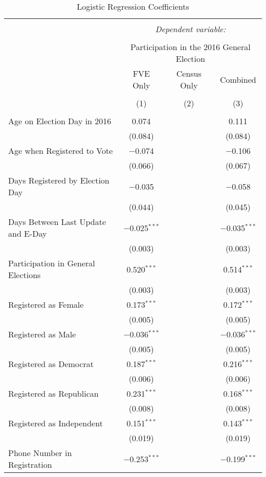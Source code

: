 
\begingroup 
\small 
\centering
\begin{longtable}{@{\extracolsep{5pt}}lccc}
  \caption{Logistic Regression Coefficients} \label{logistic} 
\\ \hline 
\hline \\[-1.8ex] 
 & \multicolumn{3}{c}{\textit{Dependent variable:}} \\ 
\cline{2-4} 
\\[-1.8ex] & \multicolumn{3}{c}{Participation in the 2016 General Election} \\ 
 & FVE Only & Census Only & Combined \\ 
\\[-1.8ex] & (1) & (2) & (3)\\ 
\hline \\[-1.8ex] 
 Age on Election Day in 2016 & 0.074 &  & 0.111 \\ 
  & (0.084) &  & (0.084) \\ 
  Age when Registered to Vote & $-$0.074 &  & $-$0.106 \\ 
  & (0.066) &  & (0.067) \\ 
  Days Registered by Election Day & $-$0.035 &  & $-$0.058 \\ 
  & (0.044) &  & (0.045) \\ 
  Days Between Last Update and E-Day & $-$0.025$^{***}$ &  & $-$0.035$^{***}$ \\ 
  & (0.003) &  & (0.003) \\ 
  Participation in General Elections & 0.520$^{***}$ &  & 0.514$^{***}$ \\ 
  & (0.003) &  & (0.003) \\ 
  Registered as Female & 0.173$^{***}$ &  & 0.172$^{***}$ \\ 
  & (0.005) &  & (0.005) \\ 
  Registered as Male & $-$0.036$^{***}$ &  & $-$0.036$^{***}$ \\ 
  & (0.005) &  & (0.005) \\ 
  Registered as Democrat & 0.187$^{***}$ &  & 0.216$^{***}$ \\ 
  & (0.006) &  & (0.006) \\ 
  Registered as Republican & 0.231$^{***}$ &  & 0.168$^{***}$ \\ 
  & (0.008) &  & (0.008) \\ 
  Registered as Independent & 0.151$^{***}$ &  & 0.143$^{***}$ \\ 
  & (0.019) &  & (0.019) \\ 
  Phone Number in Registration & $-$0.253$^{***}$ &  & $-$0.199$^{***}$ \\ 

\end{longtable}
